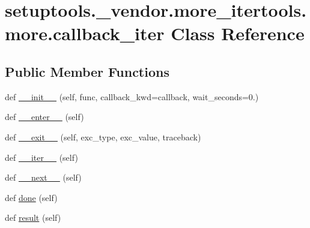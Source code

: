 \hypertarget{classsetuptools_1_1__vendor_1_1more__itertools_1_1more_1_1callback__iter}{}\section{setuptools.\+\_\+vendor.\+more\+\_\+itertools.\+more.\+callback\+\_\+iter Class Reference}
\label{classsetuptools_1_1__vendor_1_1more__itertools_1_1more_1_1callback__iter}
\subsection*{Public Member Functions}
\begin{DoxyCompactItemize}
\item 
def \hyperlink{classsetuptools_1_1__vendor_1_1more__itertools_1_1more_1_1callback__iter_a025217221fec8d40aca9a6515267562f}{\+\_\+\+\_\+init\+\_\+\+\_\+} (self, func, callback\+\_\+kwd=\textquotesingle{}callback\textquotesingle{}, wait\+\_\+seconds=0.)
\item 
def \hyperlink{classsetuptools_1_1__vendor_1_1more__itertools_1_1more_1_1callback__iter_aca33b386d4e9e486054b5c64ec1316c7}{\+\_\+\+\_\+enter\+\_\+\+\_\+} (self)
\item 
def \hyperlink{classsetuptools_1_1__vendor_1_1more__itertools_1_1more_1_1callback__iter_a1d005c2f4efca60ab2ca87b4904a0aea}{\+\_\+\+\_\+exit\+\_\+\+\_\+} (self, exc\+\_\+type, exc\+\_\+value, traceback)
\item 
def \hyperlink{classsetuptools_1_1__vendor_1_1more__itertools_1_1more_1_1callback__iter_a2f9f7c026cfa336c5c279b10b0420fb5}{\+\_\+\+\_\+iter\+\_\+\+\_\+} (self)
\item 
def \hyperlink{classsetuptools_1_1__vendor_1_1more__itertools_1_1more_1_1callback__iter_a0b715d772929033fe7f75e4661b82f73}{\+\_\+\+\_\+next\+\_\+\+\_\+} (self)
\item 
def \hyperlink{classsetuptools_1_1__vendor_1_1more__itertools_1_1more_1_1callback__iter_a7f3002c09765824dce2dde2655d528e7}{done} (self)
\item 
def \hyperlink{classsetuptools_1_1__vendor_1_1more__itertools_1_1more_1_1callback__iter_a48aef2036093325100f236fdaa7dc0fc}{result} (self)
\end{DoxyCompactItemize}



